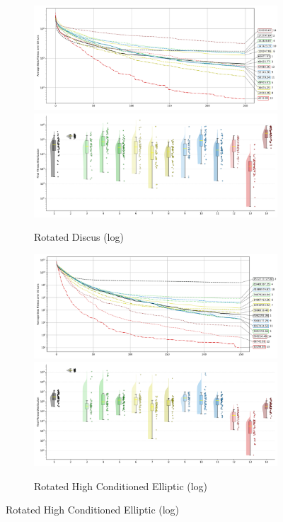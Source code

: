 \begin{figure}[p]\ContinuedFloat
\renewcommand\thesubfigure{C.\arabic{figure}.\arabic{subfigure}} %

    \centering


\begin{subfigure}{1\textwidth}
    \centering
    \includegraphics[width=.49\textwidth]{Figures/results/500/Rotated_Discus_All_selected_algorithms_dim500_annot_legend.png}
    \includegraphics[width=.49\textwidth]{Figures/results/500/Rotated_Discus_all_dim500_raincloud_vertical.png}
    \caption{Rotated Discus (log)}
\end{subfigure}

\begin{subfigure}{1\textwidth}
    \centering
    \includegraphics[width=.49\textwidth]{Figures/results/500/Rotated_High_Conditioned_Elliptic_All_selected_algorithms_dim500_annot_legend.png}
    \includegraphics[width=.49\textwidth]{Figures/results/500/Rotated_High_Conditioned_Elliptic_all_dim500_raincloud_vertical.png}
    \caption{Rotated High Conditioned Elliptic (log)}
\end{subfigure}


\end{figure}
